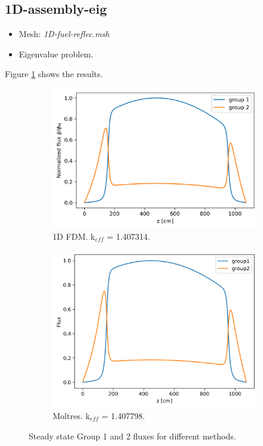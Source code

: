 \documentclass[11pt,letterpaper]{article}
\begin{document}
\subsection{1D-assembly-eig}

	\begin{itemize}
		\item Mesh: \textit{1D-fuel-reflec.msh}
		\item Eigenvalue problem.
	\end{itemize}

Figure \ref{fig:1D-assembly-eig} shows the results.

	\begin{figure}[htbp!]
		\centering
		\begin{subfigure}[t]{0.4\textwidth}
			\centering
			\includegraphics[width=\linewidth]{1D-assembly-eig-FDM}
			\caption{1D FDM. k$_{eff}$ = 1.407314.}
		\end{subfigure}
		\begin{subfigure}[t]{0.4\textwidth}
			\centering
			\includegraphics[width=\linewidth]{1D-assembly}
			\caption{Moltres. k$_{eff}$ = 1.407798.}
		\end{subfigure}
		\hfill
		\caption{Steady state Group 1 and 2 fluxes for different methods.}
		\label{fig:1D-assembly-eig}
	\end{figure}

\pagebreak

% 
\end{document}
